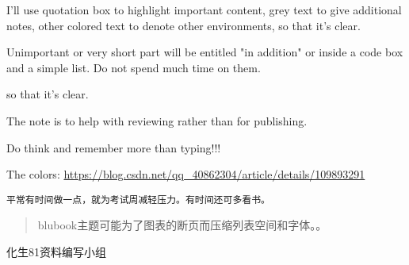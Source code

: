 \documentclass[]{article}
\begin{document}
I'll use quotation box to highlight important content, grey text to give
additional notes, other colored text to denote other environments, so
that it's clear.

Unimportant or very short part will be entitled "in addition" or inside
a code box and a simple list. Do not spend much time on them.

 so that it's clear.

 The note is to help with reviewing rather than for publishing.

 Do think and remember more than typing!!!

The colors:
\url{https://blog.csdn.net/qq_40862304/article/details/109893291}

\begin{verbatim}
平常有时间做一点，就为考试周减轻压力。有时间还可多看书。
\end{verbatim}

\begin{quote}
blubook主题可能为了图表的断页而压缩列表空间和字体。。
\end{quote}

化生81资料编写小组
\end{document}
